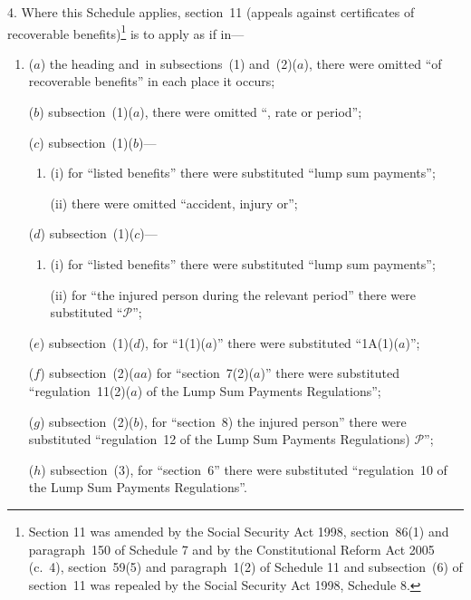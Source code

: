 \documentclass[12pt,a4paper]{article}
\begin{document}
4.  Where this Schedule applies, section~11 (appeals against certificates of recoverable benefits)\footnote{Section 11 was amended by the Social Security Act 1998, section~86(1) and paragraph~150 of Schedule 7 and by the Constitutional Reform Act 2005 (c.~4), section~59(5) and paragraph~1(2) of Schedule 11 and subsection~(6) of section~11 was repealed by the Social Security Act 1998, Schedule 8.} is to apply as if in—
\begin{enumerate}\item[]
($a$) the heading and~in subsections~(1) and~(2)($a$), there were omitted “of recoverable benefits” in each place it occurs;

($b$) subsection~(1)($a$), there were omitted “, rate or period”;

($c$) subsection~(1)($b$)—
\begin{enumerate}\item[]
(i) for “listed benefits” there were substituted “lump sum payments”;

(ii) there were omitted “accident, injury or”;
\end{enumerate}

($d$) subsection~(1)($c$)—
\begin{enumerate}\item[]
(i) for “listed benefits” there were substituted “lump sum payments”;

(ii) for “the injured person during the relevant period” there were substituted “$\mathcal{P}$”;
\end{enumerate}

($e$) subsection~(1)($d$), for “1(1)($a$)” there were substituted “1A(1)($a$)”;

($f$) subsection~(2)($aa$)  for “section~7(2)($a$)” there were substituted “regulation~11(2)($a$)  of the Lump Sum Payments Regulations”;

($g$) subsection~(2)($b$), for “section~8) the injured person” there were substituted “regulation~12 of the Lump Sum Payments Regulations) $\mathcal{P}$”;

($h$) subsection~(3), for “section~6” there were substituted “regulation~10 of the Lump Sum Payments Regulations”.
\end{enumerate}

\medskip
\end{document}
